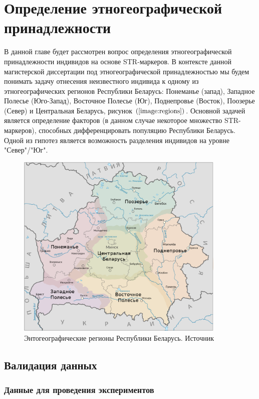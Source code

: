 \chapter{Определение этногеографической принадлежности}

В данной главе будет рассмотрен вопрос определения этногеографической принадлежности
индивидов на основе STR-маркеров. В контексте данной магистерской диссертации под
этногеографической принадлежностью мы будем понимать задачу отнесения неизвестного
индивида к одному из этногеографических регионов Республики Беларусь: Понеманье (запад),
Западное Полесье (Юго-Запад), Восточное Полесье (Юг), Поднепровье (Восток), Поозерье (Север) и
Центральная Беларусь, рисунок $\left(\ref{image:regions}\right)$. Основной задачей является определение факторов (в данном случае некоторое
множество STR-маркеров), способных дифференцировать популяцию Республики Беларусь. Одной из гипотез
является возможность разделения индивидов на уровне "Север"/"Юг".


\begin{figure}[h]
\begin{center}
\includegraphics[width=10cm]{images/belarus_regions.png}
\end{center}
  \caption{Энтогеографические регионы Республики Беларусь. Источник}
  \label{image:regions}
\end{figure}

\section{Валидация данных}

\subsection{Данные для проведения экспериментов}

